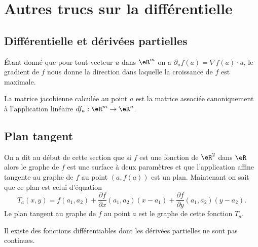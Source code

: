 \section{Autres trucs sur la différentielle}

\subsection{Différentielle et dérivées partielles}

Étant donné que pour tout vecteur \( u\) dans \( \eR^m\) on a \( \partial_uf(a)=\nabla f(a)\cdot u\), le gradient de \( f\) nous donne la direction dans laquelle la croissance de \( f\) est maximale.

La matrice jacobienne calculée au point \( a\) est la matrice associée canoniquement à l'application linéaire \( df_a:\eR^m\to\eR^n\).

\subsection{Plan tangent}

On a dit au début de cette section que si \( f\) est une fonction de \( \eR^2\) dans \( \eR\) alors le graphe de \( f\) est une surface à deux paramètres et que l'application affine tangente au graphe de \( f\) au point \( (a, f(a))\) est un plan. Maintenant on sait que ce plan est celui d'équation
\begin{equation}
	T_a(x,y)=f(a_1,a_2)+\frac{ \partial f }{ \partial x }(a_1,a_2)(x-a_1)+\frac{ \partial f }{ \partial y }(a_1,a_2)(y-a_2).
\end{equation}
Le plan tangent au graphe de \( f\) au point \( a\) est le graphe de cette fonction \( T_a\).

\begin{proposition}     \label{PROPooJPRUooNOcXPJ}
	Il existe des fonctions différentiables dont les dérivées partielles ne sont pas continues.
\end{proposition}

